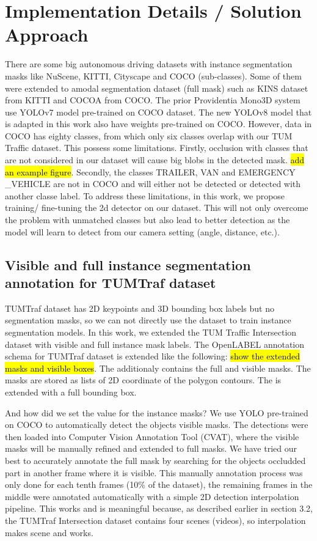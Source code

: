 \chapter{Implementation Details / Solution Approach}%

There are some big autonomous driving datasets with instance segmentation masks like NuScene, KITTI, Cityscape and COCO (sub-classes). Some of them were extended to amodal segmentation dataset (full mask) such as KINS dataset from KITTI and COCOA from COCO. The prior Providentia Mono3D system use YOLOv7 model pre-trained on COCO dataset. The new YOLOv8 model that is adapted in this work also have weights pre-trained on COCO. However, data in COCO has eighty classes, from which only six classes overlap with our TUM Traffic dataset. This possess some limitations. Firstly, occlusion with classes that are not considered in our dataset will cause big blobs in the detected mask.  \hl{add an example figure}. Secondly, the classes TRAILER, VAN and EMERGENCY \_VEHICLE are not in COCO and will either not be detected or detected with another classe label. To address these limitations, in this work, we propose training/ fine-tuning the 2d detector on our dataset. This will not only overcome the problem with unmatched classes but also lead to better detection as the model will learn to detect from our camera setting (angle, distance, etc.). 


\section{Visible and full instance segmentation annotation for TUMTraf dataset}

TUMTraf dataset has 2D keypoints and 3D bounding box labels but no segmentation masks, so we can not directly use the dataset to train instance segmentation models. In this work, we extended the TUM Traffic Intersection dataset with visible and full instance mask labels. The OpenLABEL annotation schema for TUMTraf dataset is extended like the following: \hl{show the extended masks and visible boxes}. The additionaly  contains the full and visible masks. The masks are stored as lists of 2D coordinate of the polygon contours. The  is extended with a full bounding box. 

And how did we set the value for the instance masks? We use YOLO pre-trained on COCO to automatically detect the objects visible masks. The detections were then loaded into Computer Vision Annotation Tool (CVAT), where the visible masks will be manually refined and extended to full masks. We have tried our best to accurately annotate the full mask by searching for the objects occludded part in another frame where it is visible. This manually annotation process was only done for each tenth frames (10\% of the dataset), the remaining frames in the middle were annotated automatically with a simple 2D detection interpolation pipeline. This works and is meaningful because, as described earlier in section 3.2, the TUMTraf Intersection dataset contains four scenes (videos), so interpolation makes scene and works.   

